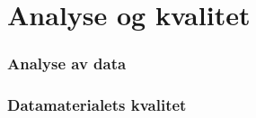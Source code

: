 \section{Analyse og kvalitet}
\label{chp: analyse}


\subsubsection{Analyse av data}
\subsubsection{Datamaterialets kvalitet}